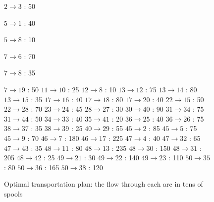 \begin{figure}[H]
\centering
\begin{multicols}{5}
$ 2 \rightarrow 3 $ : 50

$ 5 \rightarrow 1 $ : 40

$ 5 \rightarrow 8 $ : 10

$ 7 \rightarrow 6 $ : 70

$ 7 \rightarrow 8 $ : 35

$ 7 \rightarrow 19 $ : 50
$ 11 \rightarrow 10 $ : 25
$ 12 \rightarrow 8 $ : 10
$ 13 \rightarrow 12 $ : 75
$ 13 \rightarrow 14 $ : 80
$ 13 \rightarrow 15 $ : 35
$ 17 \rightarrow 16 $ : 40
$ 17 \rightarrow 18 $ : 80
$ 17 \rightarrow 20 $ : 40
$ 22 \rightarrow 15 $ : 50
$ 22 \rightarrow 28 $ : 70
$ 23 \rightarrow 24 $ : 45
$ 28 \rightarrow 27 $ : 30
$ 30 \rightarrow 40 $ : 90
$ 31 \rightarrow 34 $ : 75
$ 31 \rightarrow 44 $ : 50
$ 34 \rightarrow 33 $ : 40
$ 35 \rightarrow 41 $ : 20
$ 36 \rightarrow 25 $ : 40
$ 36 \rightarrow 26 $ : 75
$ 38 \rightarrow 37 $ : 35
$ 38 \rightarrow 39 $ : 25
$ 40 \rightarrow 29 $ : 55
$ 45 \rightarrow 2 $ : 85
$ 45 \rightarrow 5 $ : 75
$ 45 \rightarrow 9 $ : 70
$ 46 \rightarrow 7 $ : 180
$ 46 \rightarrow 17 $ : 225
$ 47 \rightarrow 4 $ : 40
$ 47 \rightarrow 32 $ : 65
$ 47 \rightarrow 43 $ : 35
$ 48 \rightarrow 11 $ : 80
$ 48 \rightarrow 13 $ : 235
$ 48 \rightarrow 30 $ : 150
$ 48 \rightarrow 31 $ : 205
$ 48 \rightarrow 42 $ : 25
$ 49 \rightarrow 21 $ : 30
$ 49 \rightarrow 22 $ : 140
$ 49 \rightarrow 23 $ : 110
$ 50 \rightarrow 35 $ : 80
$ 50 \rightarrow 36 $ : 165
$ 50 \rightarrow 38 $ : 120
\end{multicols}
\caption{Optimal transportation plan: the flow through each arc in tens of spools}
\label{flow3-2a}
\end{figure}

